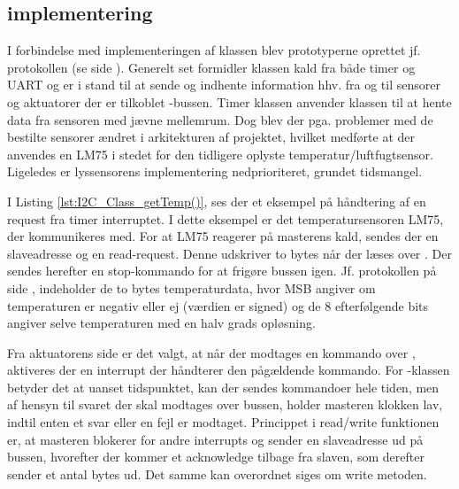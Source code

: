 

\clearpage

\subsection{\IIC implementering} 
I forbindelse med implementeringen af \IIC klassen blev prototyperne oprettet jf. \IIC protokollen (se side \pageref{sec:I2C_protokol}).
Generelt set formidler klassen kald fra både timer og UART og er i stand til at sende og indhente information hhv. fra og til sensorer og aktuatorer der er tilkoblet \IIC-bussen.
Timer klassen anvender \IIC klassen til at hente data fra sensoren med jævne mellemrum.
Dog blev der pga. problemer med de bestilte sensorer ændret i arkitekturen af projektet, hvilket medførte at der anvendes en LM75 i stedet for den tidligere oplyste temperatur/luftfugtsensor.
Ligeledes er lyssensorens implementering nedprioriteret, grundet tidsmangel.



I Listing \ref{lst:I2C_Class_getTemp()}, ses der et eksempel på håndtering af en request fra timer interruptet. 
I dette eksempel er det temperatursensoren LM75, der kommunikeres med. 
For at LM75 reagerer på masterens kald, sendes der en slaveadresse og en read-request. 
Denne udskriver to bytes når der læses over \IIC. 
Der sendes herefter en \IIC stop-kommando for at frigøre bussen igen.
Jf. \IIC protokollen på side \pageref{sec:I2C_protokol}, indeholder de to bytes temperaturdata, hvor MSB angiver om temperaturen er negativ eller ej (værdien er signed) og de 8 efterfølgende bits angiver selve temperaturen med en halv grads opløsning. 

Fra aktuatorens side er det valgt, at når der modtages en kommando over \IIC, aktiveres der en interrupt der håndterer den pågældende kommando. 
For \IIC-klassen betyder det at uanset tidspunktet, kan der sendes kommandoer hele tiden, men af hensyn til svaret der skal modtages over bussen, holder masteren klokken lav, indtil enten et svar eller en fejl er modtaget. 
Princippet i read/write funktionen er, at masteren blokerer for andre interrupts og sender en slaveadresse ud på bussen, hvorefter der kommer et acknowledge tilbage fra slaven, som derefter sender et antal bytes ud. 
Det samme kan overordnet siges om write metoden.


